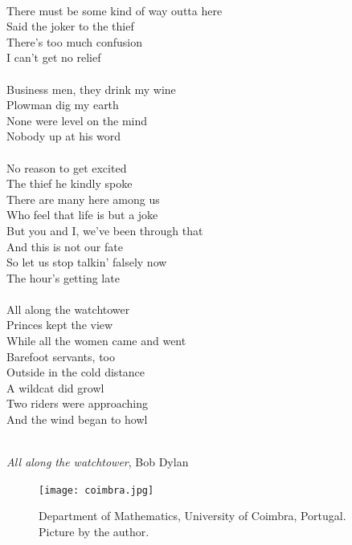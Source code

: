 \documentclass[11pt, english, singlespacing, headsepline, ]{MastersDoctoralThesis}
\theoremstyle{definition}
\begin{document}
\cleardoublepage
 $\mbox{}$\\
There must be some kind of way outta here\\
Said the joker to the thief\\
There's too much confusion\\
I can't get no relief\\
\\
Business men, they drink my wine\\
Plowman dig my earth\\
None were level on the mind\\
Nobody up at his word\\
\\
No reason to get excited\\
The thief he kindly spoke\\
There are many here among us\\
Who feel that life is but a joke\\
But you and I, we've been through that\\
And this is not our fate\\
So let us stop talkin' falsely now\\
The hour's getting late\\
\\
All along the watchtower\\
Princes kept the view\\
While all the women came and went\\
Barefoot servants, too\\
Outside in the cold distance\\
A wildcat did growl\\
Two riders were approaching\\
And the wind began to howl\\
\\
\begin{flushright}
\textit{All along the watchtower}, Bob Dylan
\end{flushright}

\begin{figure}
\captionsetup{width=1\textwidth}
\centering
\texttt{[image: coimbra.jpg]}
\caption{Department of Mathematics, University of Coimbra, Portugal. \\Picture by the author.}
\end{figure}


\end{document}
